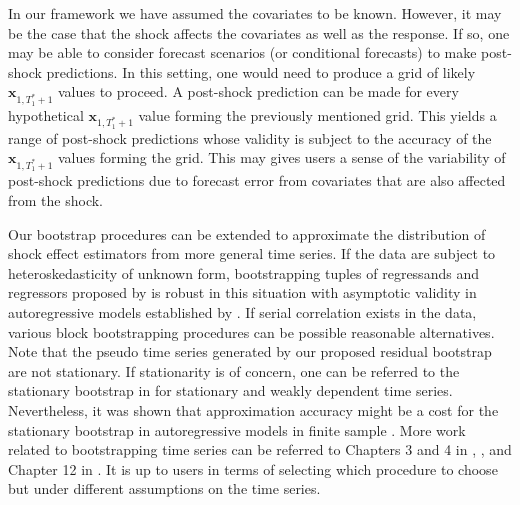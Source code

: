\documentclass[11pt,3p,review,authoryear]{elsarticle}
\theoremstyle{definition}
\begin{document}
In our framework we have assumed the covariates to be known. However, it may be the case that the shock affects the covariates as well as the response. If so, one may be able to consider forecast scenarios (or conditional forecasts) \citep{baumeister2014real} to make post-shock predictions. In this setting, one would need to produce a grid of likely $\mathbf{x}_{1, T_1^* + 1}$ values to proceed. A post-shock prediction can be made for every hypothetical $\mathbf{x}_{1, T_1^* + 1}$ value forming the previously mentioned grid. This yields a range of post-shock predictions whose validity is subject to the accuracy of the $\mathbf{x}_{1, T_1^* + 1}$ values forming the grid. This may gives users a sense of the variability of post-shock predictions due to forecast error from covariates that are also affected from the shock.


Our bootstrap procedures can be extended to approximate the distribution of shock effect estimators from more general time series. If the data are subject to heteroskedasticity of unknown form, bootstrapping tuples of regressands and regressors proposed by \citet{freedman1981bootstrapping} is robust in this situation with asymptotic validity in autoregressive models established by \citet{gonccalves2004bootstrapping}. If serial correlation exists in the data, various block bootstrapping procedures \citep{kunsch1989jackknife, liu1992moving} can be possible reasonable alternatives. Note that the pseudo time series generated by our proposed residual bootstrap are not stationary. If stationarity is of concern, one can be referred to the stationary bootstrap in \citet{politis1994stationary} for stationary and weakly dependent time series. Nevertheless, it was shown that approximation accuracy might be a cost for the stationary bootstrap in autoregressive  models in finite sample \citep{berkowitz1999finite}.  More work related to bootstrapping time series  can be referred to Chapters 3 and 4 in \citet{politis1999subsampling}, \citet{berkowitz2000recent}, and Chapter 12 in \citet{kilian2017structural}. It is up to  users in terms of selecting which procedure to choose but under different assumptions on the time series.
\end{document}
